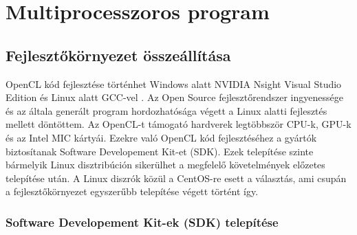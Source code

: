 \chapter{Multiprocesszoros program}

\section{Fejlesztőkörnyezet összeállítása}
	OpenCL kód fejlesztése történhet Windows alatt NVIDIA Nsight Visual Studio
	Edition \cite{nsight} és Linux alatt GCC-vel \cite{gcc}.
	Az Open Source fejlesztőrendszer ingyenessége és az általa generált program hordozhatósága végett
	a Linux alatti fejlesztés mellett döntöttem. 
	Az OpenCL-t támogató hardverek legtöbbször CPU-k, GPU-k és az Intel MIC
	\cite{mic} kártyái.
	Ezekre való OpenCL kód fejlesztéséhez a gyártók biztosítanak Software Developement Kit-et (SDK).
	Ezek telepítése szinte bármelyik Linux disztribúción sikerülhet a megfelelő követelmények előzetes telepítése után.
	A Linux diszrók közül a CentOS-re \cite{centos} esett a választás, ami 
	csupán a fejlesztőkörnyezet egyszerűbb telepítése végett történt így.

\subsection{Software Developement Kit-ek (SDK) telepítése} \label{sect:sdk}
